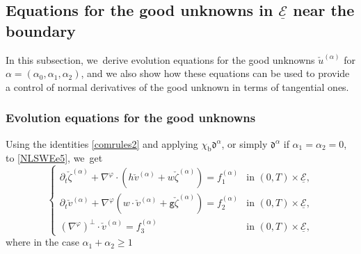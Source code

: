 \documentclass[10pt]{amsart}
\newcommand{\gr}{{\mathtt g}}
\newcommand{\dt}{\partial_t}
\newcommand{\cE}{{\mathcal E}}
\newcommand{\ul}[1]{\underline{#1}}
\theoremstyle{definition}
\begin{document}
\subsection{Equations for the good unknowns in $\ul{\cE}$ near the boundary}\label{subsect:EGUe}
In this subsection, we~derive evolution equations for the good unknowns $\check{u}^{(\alpha)}$ for $\alpha=(\alpha_0,\alpha_1,\alpha_2)$,
and we also show how these equations can be used to provide a control of normal derivatives of the good unknown in terms of tangential ones.

\subsubsection{Evolution equations for the good unknowns}
Using the identities \eqref{comrules2} and applying $\chi_\mathrm{b}\mathfrak{d}^{\alpha}$,
or simply $\mathfrak{d}^{\alpha}$ if $\alpha_1=\alpha_2=0$, to \eqref{NLSWEe5}, we~get
\begin{equation}\label{QLSWEe}
\begin{cases}
\dt\check{\zeta}^{(\alpha)}+\nabla^\varphi\cdot(h\check{v}^{(\alpha)}+w\check{\zeta}^{(\alpha)}) = f_1^{(\alpha)} &\text{in } (0,T)\times\ul{\cE}, \\
\dt\check{v}^{(\alpha)}+\nabla^\varphi(w\cdot\check{v}^{(\alpha)}+\gr\check{\zeta}^{(\alpha)}) = f_2^{(\alpha)} &\text{in } (0,T)\times\ul{\cE}, \\
(\nabla^\varphi)^\perp\cdot\check{v}^{(\alpha)} = f_3^{(\alpha)} &\text{in } (0,T)\times\ul{\cE},
\end{cases}
\end{equation}
where in the case $\alpha_1+\alpha_2\geq1$
\end{document}
